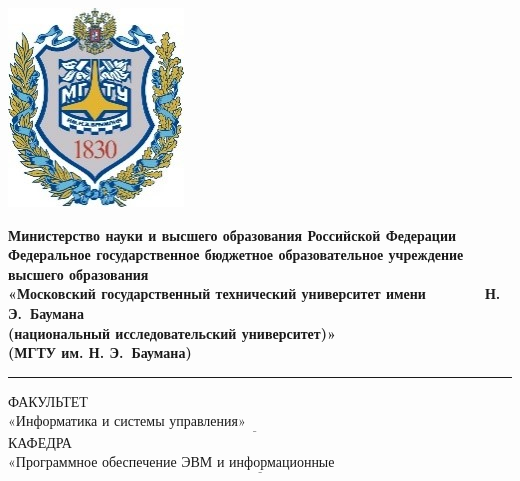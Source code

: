 \begin{titlepage}
	\fontsize{12pt}{12pt}\selectfont
	\noindent \begin{minipage}{0.15\textwidth}
		\includegraphics[width=\linewidth]{img/b_logo.jpg}
	\end{minipage}
	\noindent\begin{minipage}{0.9\textwidth}\centering
		\textbf{Министерство науки и высшего образования Российской Федерации}\\
		\textbf{Федеральное государственное бюджетное образовательное учреждение высшего образования}\\
		\textbf{«Московский государственный технический университет имени ~~~~~~ Н. Э.~Баумана}\\
		\textbf{(национальный исследовательский университет)»}\\
		\textbf{(МГТУ им. Н. Э.~Баумана)}
	\end{minipage}
	
	\noindent\rule{18cm}{3pt}
	\newline\newline
	\noindent ФАКУЛЬТЕТ $\underline{\text{«Информатика и системы управления»~~~~~~~~~~~~~~~~~~~~~~~~~~~~~~~~~~~~~~~~~~~~~~~~~~~~~~~}}$ \newline\newline
	\noindent КАФЕДРА $\underline{\text{«Программное обеспечение ЭВМ и информационные технологии»~~~~~~~~~~~~~~~~~~~~~~~}}$\newline\newline\newline\newline\newline\newline\newline



\end{titlepage}
